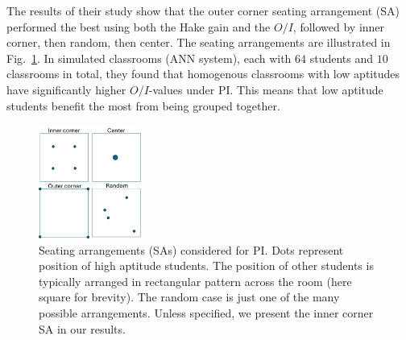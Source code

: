 \documentclass[twocolumn,secnumarabic,amssymb, nobibnotes, aps, prd]{revtex4-2}
\begin{document}
    The results of their study show that the outer corner seating arrangement (SA) performed the best using both the Hake gain and the $O/I$, followed by inner corner, then random, then center.
    The seating arrangements are illustrated in Fig.~\ref{fig:PI-SAs}.
    In simulated classrooms (ANN system), each with $64$ students and $10$ classrooms in total, they found that homogenous classrooms with low aptitudes have significantly higher $O/I$-values {under PI}.
    This means that low aptitude students benefit the most from being grouped together.
    \begin{figure}[htb]
        \centering
        \includegraphics[width=0.30\textwidth]{figures/PI SAs.png}
        \caption{%
        Seating arrangements (SAs) considered for PI.
        Dots represent position of high aptitude students.
        The position of other students {is} typically arranged in rectangular pattern across the room (here square for brevity).
        The random case is just one of the many possible arrangements.
        Unless specified, we present the inner corner SA in our results.
        }
        \label{fig:PI-SAs}
    \end{figure}
\end{document}
